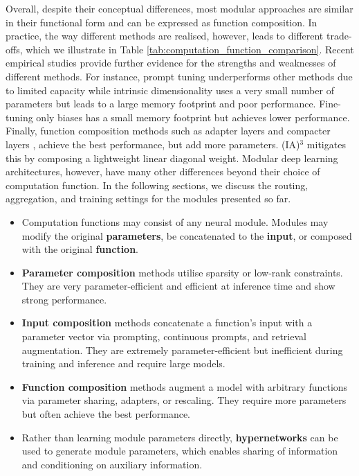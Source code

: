 \documentclass[10pt]{article} %
\begin{document}
Overall, despite their conceptual differences, most modular approaches are similar in their functional form and can be expressed as function composition. In practice, the way different methods are realised, however, leads to different trade-offs, which we illustrate in Table \ref{tab:computation_function_comparison}. Recent empirical studies \citep{Mahabadi2021Compacter,He2021UnifiedAdapters,Liu2022IA3} provide further evidence for the strengths and weaknesses of different methods. For instance, prompt tuning \citep{Vu2022prompt} underperforms other methods due to limited capacity while intrinsic dimensionality \citep{aghajanyan-etal-2021-intrinsic} uses a very small number of parameters but leads to a large memory footprint and poor performance. Fine-tuning only biases \citep{ben-zaken-etal-2022-bitfit} has a small memory footprint but achieves lower performance. Finally, function composition methods such as adapter  layers \citep{pfeiffer2020adapterfusion} and compacter layers \citep{Mahabadi2021Compacter}, achieve the best performance, but add more parameters. (IA)$^3$ \citep{Liu2022IA3} mitigates this by composing a lightweight linear diagonal weight. 
Modular deep learning architectures, however, have many other differences beyond their choice of computation function. In the following sections, we discuss the routing, aggregation, and training settings for the modules presented so far.


\begin{tcolorbox}{%
    \begin{itemize}
      \setlength\itemsep{-.1em}
        \item Computation functions may consist of any neural module. Modules may modify the original \textbf{parameters}, be concatenated to the \textbf{input}, or composed with the original \textbf{function}.
        \item \textbf{Parameter composition} methods utilise sparsity or low-rank constraints. They are very parameter-efficient and efficient at inference time and show strong performance. 
        \item \textbf{Input composition} methods concatenate a function's input with a parameter vector via prompting, continuous prompts, and retrieval augmentation. They are extremely parameter-efficient but inefficient during training and inference and require large models.
        \item \textbf{Function composition} methods augment a model with arbitrary functions via parameter sharing, adapters, or rescaling. They require more parameters but often achieve the best performance.
        \item Rather than learning module parameters directly, \textbf{hypernetworks} can be used to generate module parameters, which enables sharing of information and conditioning on auxiliary information.
        \end{itemize}
    }%
\end{tcolorbox}
\end{document}
